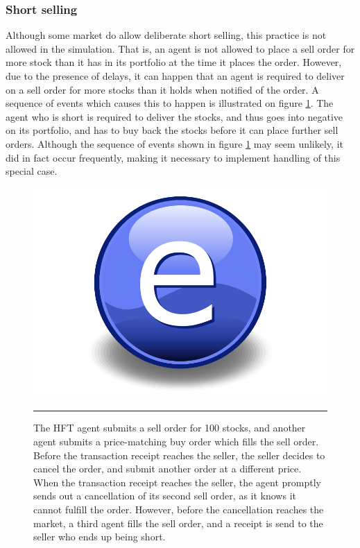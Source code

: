 \subsubsection{Short selling}
Although some market do allow deliberate short selling, this practice is not allowed in the simulation. That is, an agent is not allowed to place a sell order for more stock than it has in its portfolio at the time it places the order. However, due to the presence of delays, it can happen that an agent is required to deliver on a sell order for more stocks than it holds when notified of the order. A sequence of events which causes this to happen is  illustrated on figure \ref{fig:short_selling}. The agent who is short is required to deliver the stocks, and thus goes into negative on its portfolio, and has to buy back the stocks before it can place further sell orders. Although the sequence of events shown in figure \ref{fig:short_selling} may seem unlikely, it did in fact occur frequently, making it necessary to implement handling of this special case. 
\begin{figure}[htbp]
	\centering
		\includegraphics{Figures/Electron.pdf}
		\rule{35em}{0.5pt}
	\caption{The HFT agent submits a sell order for 100 stocks, and another agent submits a price-matching buy order which fills the sell order. Before the transaction receipt reaches the seller, the seller decides to cancel the order, and submit another order at a different price. When the transaction receipt reaches the seller, the agent promptly sends out a cancellation of its second sell order, as it knows it cannot fulfill the order. However, before the cancellation reaches the market, a third agent fills the sell order, and a receipt is send to the seller who ends up being short.}
	\label{fig:short_selling}
\end{figure}




